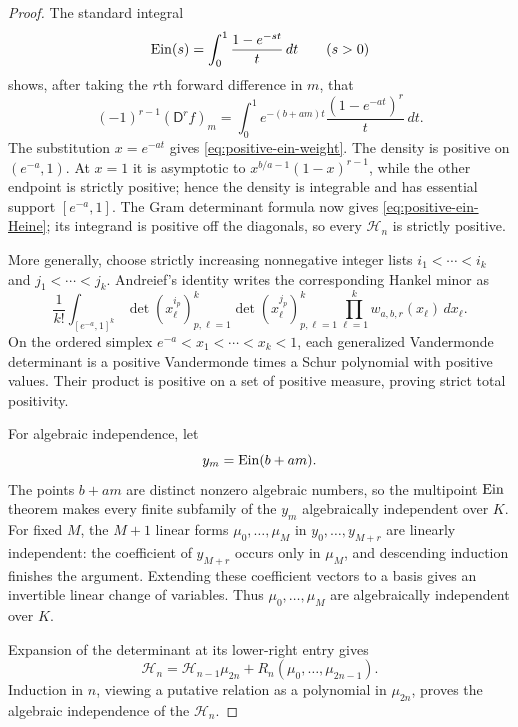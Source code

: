 \begin{proof}
The standard integral
\[
 \operatorname{Ein}(s)=\int_0^1\frac{1-e^{-st}}t\,dt\qquad(s>0)
\]
shows, after taking the $r$th forward difference in $m$, that
\[
 (-1)^{r-1}(\mathsf D^rf)_m
 =\int_0^1e^{-(b+am)t}\frac{(1-e^{-at})^r}{t}\,dt.
\]
The substitution $x=e^{-at}$ gives
\eqref{eq:positive-ein-weight}.  The density is positive on
$(e^{-a},1)$.  At $x=1$ it is asymptotic to
$x^{b/a-1}(1-x)^{r-1}$, while the other endpoint is strictly positive;
hence the density is integrable and has essential support
$[e^{-a},1]$.  The Gram determinant formula now gives
\eqref{eq:positive-ein-Heine}; its integrand is positive off the
diagonals, so every $\mathcal H_n$ is strictly positive.

More generally, choose strictly increasing nonnegative integer lists
$i_1<\cdots<i_k$ and $j_1<\cdots<j_k$.  Andreief's identity writes the
corresponding Hankel minor as
\[
 \frac1{k!}\int_{[e^{-a},1]^k}
 \det(x_\ell^{i_p})_{p,\ell=1}^k
 \det(x_\ell^{j_p})_{p,\ell=1}^k
 \prod_{\ell=1}^kw_{a,b,r}(x_\ell)\,dx_\ell.
\]
On the ordered simplex $e^{-a}<x_1<\cdots<x_k<1$, each generalized
Vandermonde determinant is a positive Vandermonde times a Schur
polynomial with positive values.  Their product is positive on a set of
positive measure, proving strict total positivity.

For algebraic independence, let
\[
 y_m=\operatorname{Ein}(b+am).
\]
The points $b+am$ are distinct nonzero algebraic numbers, so the
multipoint $\operatorname{Ein}$ theorem makes every finite subfamily of the $y_m$
algebraically independent over $K$.  For fixed $M$, the $M+1$ linear
forms $\mu_0,\ldots,\mu_M$ in
$y_0,\ldots,y_{M+r}$ are linearly independent: the coefficient of
$y_{M+r}$ occurs only in $\mu_M$, and descending induction finishes the
argument.  Extending these coefficient vectors to a basis gives an
invertible linear change of variables.  Thus
$\mu_0,\ldots,\mu_M$ are algebraically independent over $K$.

Expansion of the determinant at its lower-right entry gives
\begin{equation}\label{eq:positive-ein-Hankel-triangular}
 \mathcal H_n=\mathcal H_{n-1}\mu_{2n}
 +R_n(\mu_0,\ldots,\mu_{2n-1}).
\end{equation}
Induction in $n$, viewing a putative relation as a polynomial in
$\mu_{2n}$, proves the algebraic independence of the $\mathcal H_n$.


\end{proof}
